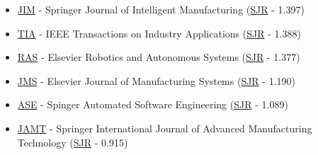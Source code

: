 \begin{itemize}[leftmargin=2em]
	\item \href{http://www.springer.com/business+\%26+management/production/journal/10845}{JIM} - Springer Journal of Intelligent Manufacturing (\href{http://www.scimagojr.com/journalsearch.php?q=24363\&tip=sid\&clean=0}{SJR} - 1.397)
	\item \href{http://ieeexplore.ieee.org/xpl/RecentIssue.jsp?punumber=28}{TIA} - IEEE Transactions on Industry Applications (\href{http://www.scimagojr.com/journalsearch.php?q=17361\&tip=sid\&clean=0}{SJR} - 1.388)
	\item \href{http://www.journals.elsevier.com/robotics-and-autonomous-systems/}{RAS} - Elsevier Robotics and Autonomous Systems (\href{http://www.scimagojr.com/journalsearch.php?q=18079\&tip=sid\&clean=0}{SJR} - 1.377)
	\item \href{http://www.journals.elsevier.com/journal-of-manufacturing-systems/}{JMS} - Elsevier Journal of Manufacturing Systems (\href{http://www.scimagojr.com/journalsearch.php?q=14966\&tip=sid\&clean=0}{SJR} - 1.190)
	\item \href{http://www.springer.com/computer/ai/journal/10515}{ASE} - Spinger Automated Software Engineering (\href{http://www.scimagojr.com/journalsearch.php?q=24145\&tip=sid\&clean=0}{SJR} - 1.089)
	\item \href{http://www.springer.com/engineering/production+engineering/journal/170}{JAMT} - Springer International Journal of Advanced Manufacturing Technology (\href{http://www.scimagojr.com/journalsearch.php?q=20428\&tip=sid\&clean=0}{SJR} - 0.915)
\end{itemize}
